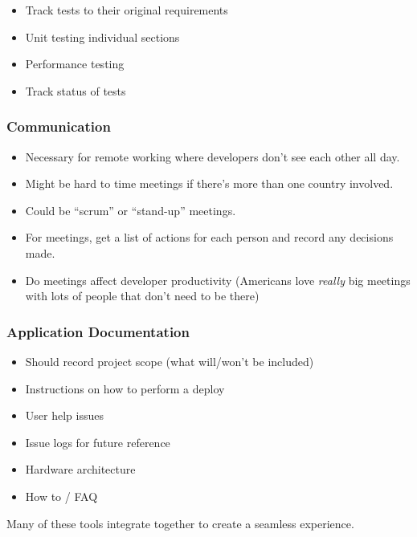 \begin{itemize}
	\item Track tests to their original requirements
	\item Unit testing individual sections
	\item Performance testing
	\item Track status of tests
\end{itemize}

\subsubsection{Communication}\label{ssub:communication}

\begin{itemize}
	\item Necessary for remote working where developers don't see each other all day.
	\item Might be hard to time meetings if there's more than one country involved.
	\item Could be ``scrum'' or ``stand-up'' meetings.
	\item For meetings, get a list of actions for each person and record any decisions made.
	\item Do meetings affect developer productivity (Americans love \emph{really} big meetings with lots of people that don't need to be there)
\end{itemize}

\subsubsection{Application Documentation}\label{ssub:application_documentation}

\begin{itemize}
	\item Should record project scope (what will/won't be included)
	\item Instructions on how to perform a deploy
	\item User help issues
	\item Issue logs for future reference
	\item Hardware architecture
	\item How to / FAQ
\end{itemize}

\begin{note}
	Many of these tools integrate together to create a seamless experience.
\end{note}

